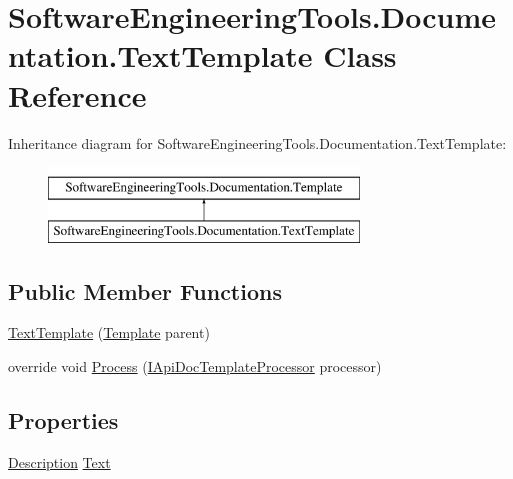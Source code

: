 \hypertarget{class_software_engineering_tools_1_1_documentation_1_1_text_template}{\section{Software\+Engineering\+Tools.\+Documentation.\+Text\+Template Class Reference}
\label{class_software_engineering_tools_1_1_documentation_1_1_text_template}
}
Inheritance diagram for Software\+Engineering\+Tools.\+Documentation.\+Text\+Template\+:\begin{figure}[H]
\begin{center}
\leavevmode
\includegraphics[height=2.000000cm]{class_software_engineering_tools_1_1_documentation_1_1_text_template}
\end{center}
\end{figure}
\subsection*{Public Member Functions}
\begin{DoxyCompactItemize}
\item 
\hyperlink{class_software_engineering_tools_1_1_documentation_1_1_text_template_a4fffba9c4b4b9c016bad1668c568aca3}{Text\+Template} (\hyperlink{class_software_engineering_tools_1_1_documentation_1_1_template}{Template} parent)
\item 
override void \hyperlink{class_software_engineering_tools_1_1_documentation_1_1_text_template_a9625c56dd7a837fb77052c37eda17a2b}{Process} (\hyperlink{interface_software_engineering_tools_1_1_documentation_1_1_i_api_doc_template_processor}{I\+Api\+Doc\+Template\+Processor} processor)
\end{DoxyCompactItemize}
\subsection*{Properties}
\begin{DoxyCompactItemize}
\item 
\hyperlink{class_software_engineering_tools_1_1_documentation_1_1_description}{Description} \hyperlink{class_software_engineering_tools_1_1_documentation_1_1_text_template_a78de805f62206a738997a7d6cb591330}{Text}
\end{DoxyCompactItemize}


